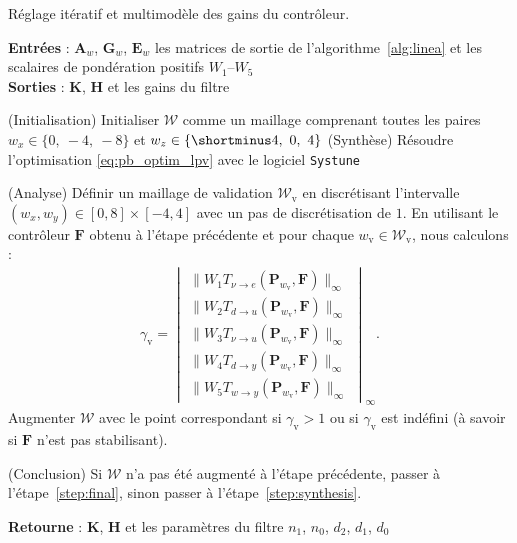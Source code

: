 \begin{algorithm}
  \caption{Réglage itératif et multimodèle des gains du contrôleur.}
  \label{alg:iterativeOptimisation}
  \hspace*{.1cm} \textbf{Entrées} : $\boldsymbol{A}_{w}$, $\boldsymbol{G}_{w}$, $\boldsymbol{E}_{w}$  les matrices de sortie de l'algorithme~\ref{alg:linea} et les scalaires de pondération positifs $W_1$--$W_5$\\
  \hspace*{.1cm} \textbf{Sorties} : $\boldsymbol{K}$, $\boldsymbol{H}$ et les gains du filtre
  \begin{algorithmic}[1]
   
    \State (Initialisation) Initialiser ${\mathcal W}$ comme un maillage comprenant toutes les paires $ w_{x} \in \{0,~-4,~-8\}$ et $ w_{z} \in \{\shortminus 4,~0,~4\}$
    \State \label{step:synthesis} (Synthèse) Résoudre l'optimisation \eqref{eq:pb_optim_lpv} avec le logiciel {\tt Systune}

    \State \label{step:analysis} (Analyse) Définir un maillage de validation ${\mathcal W}_{\text{v}}$ en discrétisant l'intervalle $(w_x,w_y) \in [0,8]\times[-4,4]$ avec un pas de discrétisation de $1$. En utilisant le contrôleur $\boldsymbol{F}$ obtenu à l'étape précédente et pour chaque $w_{\text{v}}\in {\mathcal W}_{\text{v}}$, nous calculons :
    \begin{align}
    \label{eq:validation_step}
    \gamma_{\text{v}} = \begin{vmatrix}
    \| W_{1} T_{\nu \rightarrow e}(\boldsymbol{P}_{w_{\text{v}}},\boldsymbol{F})\|_{\infty} \\
    \|W_{2} T_{d \rightarrow u}(\boldsymbol{P}_{w_{\text{v}}},\boldsymbol{F})\|_{\infty}\\
    \|W_{3} T_{\nu \rightarrow u}(\boldsymbol{P}_{w_{\text{v}}},\boldsymbol{F})\|_{\infty}\\
    \|W_{4} T_{d \rightarrow y}(\boldsymbol{P}_{w_{\text{v}}},\boldsymbol{F})\|_{\infty}\\
    \|W_{5} T_{w \rightarrow y}(\boldsymbol{P}_{w_{\text{v}}},\boldsymbol{F})\|_{\infty}
    \end{vmatrix}_{\infty}.
    \end{align}
    Augmenter  ${\mathcal W}$ avec le point correspondant si $\gamma_{\text{v}} > 1$ ou si $\gamma_{\text{v}}$ est indéfini (à savoir si $\boldsymbol{F}$ n'est pas stabilisant).


    \State (Conclusion) Si ${\mathcal W}$ n'a pas été augmenté à l'étape précédente, passer à l'étape~\ref{step:final}, sinon passer à l'étape~\ref{step:synthesis}.
    
    \State \label{step:final} 
    \textbf{Retourne} : $\boldsymbol{K}$, $\boldsymbol{H}$ et les paramètres du filtre $n_1$, $n_0$,  $d_2$,  $d_1$,  $d_0$

  \end{algorithmic}
\end{algorithm}

